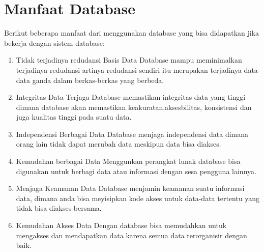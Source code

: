 \section{Manfaat Database}
Berikut beberapa manfaat dari menggunakan database yang bisa didapatkan jika bekerja dengan sistem database:
\begin{enumerate}
\item Tidak terjadinya redudansi Basis Data
\hfill \break
Database mampu meminimalkan terjadinya redudansi artinya redudansi sendiri itu merupakan terjadinya data-data ganda dalam berkas-berkas yang berbeda. 
\item Integritas Data Terjaga
\hfill \break
Database memastikan integritas data yang tinggi dimana database akan memastikan keakuratan,aksesbilitas, konsistensi dan juga kualitas tinggi pada suatu data.
\item Independensi Berbagai Data
\hfill \break
Database menjaga independensi data dimana orang lain tidak dapat merubah data meskipun data bisa diakses.
\item Kemudahan berbagai Data
\hfill \break
Menggunkan perangkat lunak database bisa digunakan untuk berbagi data atau informasi dengan sesa pengguna lainnya.
\item Menjaga Keamanan Data
Database menjamin keamanan suatu informasi data, dimana anda bisa meyisipkan kode akses untuk data-data tertentu yang tidak bisa diakses bersama.
\item Kemudahan Akses Data
\hfill \break
Dengan database bisa memudahkan untuk mengakses dan mendapatkan data karena semua data terorganisir dengan baik.
\end{enumerate}

